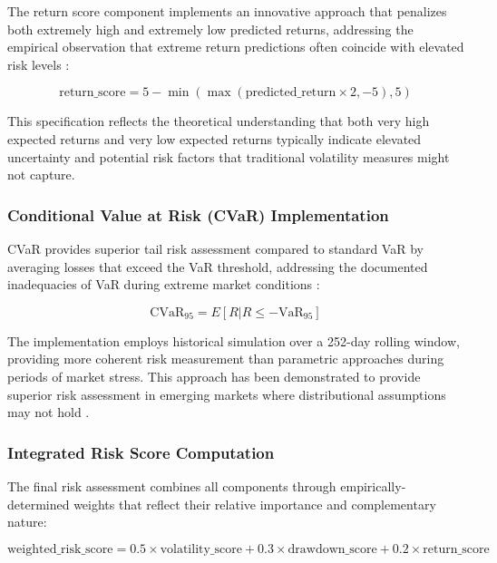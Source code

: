 \documentclass[3p,times,procedia]{elsarticle}
\begin{document}
The return score component implements an innovative approach that penalizes both extremely high and extremely low predicted returns, addressing the empirical observation that extreme return predictions often coincide with elevated risk levels \cite{Harvey2016}:

\begin{equation}
\text{return\_score} = 5 - \min(\max(\text{predicted\_return} \times 2, -5), 5)
\end{equation}

This specification reflects the theoretical understanding that both very high expected returns and very low expected returns typically indicate elevated uncertainty and potential risk factors that traditional volatility measures might not capture.

\subsubsection{{Conditional Value at Risk (CVaR) Implementation}}

CVaR provides superior tail risk assessment compared to standard VaR by averaging losses that exceed the VaR threshold, addressing the documented inadequacies of VaR during extreme market conditions \cite{Rockafellar2000}:

\begin{equation}
\text{CVaR}_{95} = E[R | R \leq -\text{VaR}_{95}]
\end{equation}

The implementation employs historical simulation over a 252-day rolling window, providing more coherent risk measurement than parametric approaches during periods of market stress. This approach has been demonstrated to provide superior risk assessment in emerging markets where distributional assumptions may not hold \cite{Jorion2001}.

\subsubsection{{Integrated Risk Score Computation}}

The final risk assessment combines all components through empirically-determined weights that reflect their relative importance and complementary nature:

\begin{equation}
\text{weighted\_risk\_score} = 0.5 \times \text{volatility\_score} + 0.3 \times \text{drawdown\_score} + 0.2 \times \text{return\_score}
\end{equation}
\end{document}

